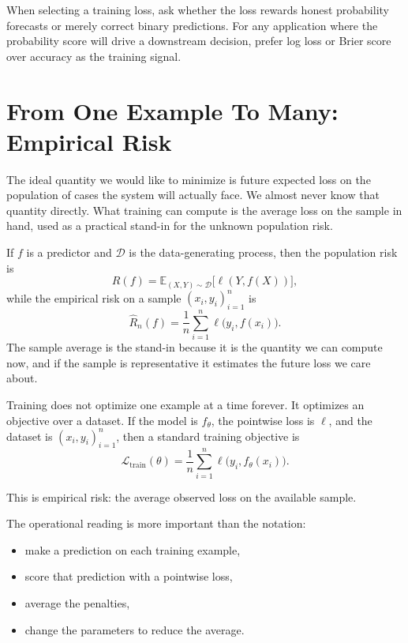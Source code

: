 \begin{practicalnote}
When selecting a training loss, ask whether the loss rewards honest probability forecasts or merely correct binary predictions. For any application where the probability score will drive a downstream decision, prefer log loss or Brier score over accuracy as the training signal.
\end{practicalnote}

\section*{From One Example To Many: Empirical Risk}

The ideal quantity we would like to minimize is future expected loss on the population of cases the system will actually face. We almost never know that quantity directly. What training can compute is the average loss on the sample in hand, used as a practical stand-in for the unknown population risk.

\begin{mathlens}
If \(f\) is a predictor and \(\mathcal{D}\) is the data-generating process, then the population risk is
\[
R(f) = \mathbb{E}_{(X,Y)\sim \mathcal{D}}\!\bigl[\ell(Y,f(X))\bigr],
\]
while the empirical risk on a sample \((x_i,y_i)_{i=1}^n\) is
\[
\hat{R}_n(f) = \frac{1}{n}\sum_{i=1}^n \ell\bigl(y_i,f(x_i)\bigr).
\]
The sample average is the stand-in because it is the quantity we can compute now, and if the sample is representative it estimates the future loss we care about.
\end{mathlens}

Training does not optimize one example at a time forever. It optimizes an objective over a dataset. If the model is \(f_\theta\), the pointwise loss is \(\ell\), and the dataset is \((x_i, y_i)_{i=1}^n\), then a standard training objective is
\[
\mathcal{L}_{\text{train}}(\theta)
=
\frac{1}{n}
\sum_{i=1}^{n}
\ell\bigl(y_i, f_\theta(x_i)\bigr).
\]

This is empirical risk: the average observed loss on the available sample.

The operational reading is more important than the notation:

\begin{itemize}[leftmargin=*]
\item make a prediction on each training example,
\item score that prediction with a pointwise loss,
\item average the penalties,
\item change the parameters to reduce the average.
\end{itemize}

